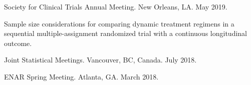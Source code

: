 \documentclass[letterpaper,11pt]{article} %
\begin{document}
\begin{etaremune}
		\begin{conflist}
			\item Society for Clinical Trials Annual Meeting. New Orleans, LA.  May 2019.
		\end{conflist}
		\item Sample size considerations for comparing dynamic treatment regimens in a sequential multiple-assignment randomized trial with a continuous longitudinal outcome.
		\begin{conflist}
			\item Joint Statistical Meetings. Vancouver, BC, Canada. July 2018.
			\item ENAR Spring Meeting. Atlanta, GA.  March 2018.
		\end{conflist}		
	\end{etaremune}
\end{document}
